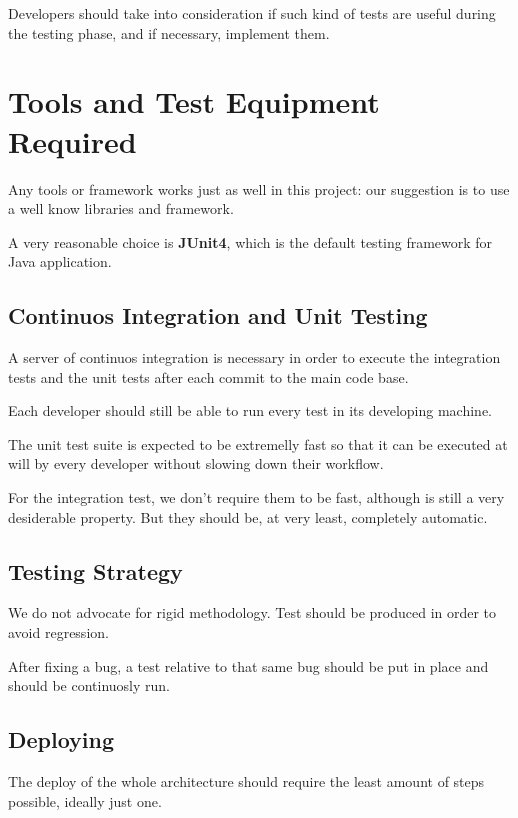 \documentclass[11pt]{article} %
\begin{document}
Developers should take into consideration if such kind of tests are useful during the testing phase, and if necessary, implement them.



\newpage
\section{Tools and Test Equipment Required}

Any tools or framework works just as well in this project: our suggestion is to use a well know libraries and framework.

A very reasonable choice is \textbf{JUnit4}, which is the default testing framework for Java application.

\subsection{Continuos Integration and Unit Testing}

A server of continuos integration is necessary in order to execute the integration tests and the unit tests after each commit to the main code base.

Each developer should still be able to run every test in its developing machine.

The unit test suite is expected to be extremelly fast so that it can be executed at will by every developer without slowing down their workflow.

For the integration test, we don't require them to be fast, although is still a very desiderable property. But they should be, at very least, completely automatic.

\subsection{Testing Strategy}

We do not advocate for rigid methodology. Test should be produced in order to avoid regression. 

After fixing a bug, a test relative to that same bug should be put in place and should be continuosly run.

\subsection{Deploying}

The deploy of the whole architecture should require the least amount of steps possible, ideally just one.
\end{document}
